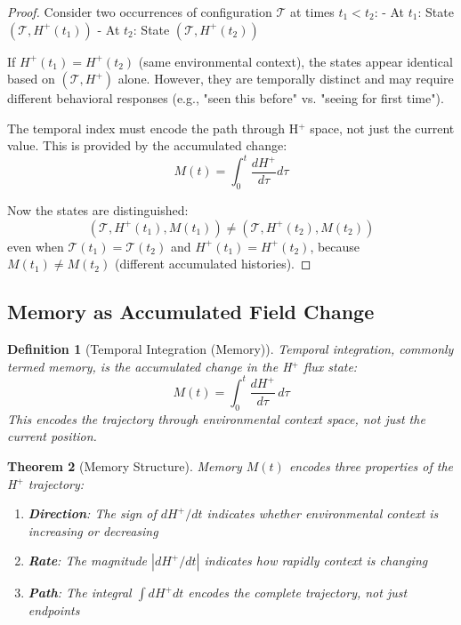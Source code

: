 \documentclass[aps,prd,twocolumn,superscriptaddress,floatfix,nofootinbib]{revtex4-2}
\newtheorem{theorem}{Theorem}[section]
\newtheorem{definition}[theorem]{Definition}
\theoremstyle{remark}
\begin{document}
\begin{proof}
Consider two occurrences of configuration $\mathcal{T}$ at times $t_1 < t_2$:
- At $t_1$: State $(\mathcal{T}, H^+(t_1))$
- At $t_2$: State $(\mathcal{T}, H^+(t_2))$

If $H^+(t_1) = H^+(t_2)$ (same environmental context), the states appear identical based on $(\mathcal{T}, H^+)$ alone. However, they are temporally distinct and may require different behavioral responses (e.g., "seen this before" vs. "seeing for first time").

The temporal index must encode the path through H$^+$ space, not just the current value. This is provided by the accumulated change:
$$
M(t) = \int_0^t \frac{dH^+}{d\tau} d\tau
$$

Now the states are distinguished:
$$
(\mathcal{T}, H^+(t_1), M(t_1)) \neq (\mathcal{T}, H^+(t_2), M(t_2))
$$
even when $\mathcal{T}(t_1) = \mathcal{T}(t_2)$ and $H^+(t_1) = H^+(t_2)$, because $M(t_1) \neq M(t_2)$ (different accumulated histories).
\end{proof}

\subsection{Memory as Accumulated Field Change}

\begin{definition}[Temporal Integration (Memory)]
\label{def:memory}
Temporal integration, commonly termed memory, is the accumulated change in the H$^+$ flux state:
\begin{equation}
\boxed{M(t) = \int_0^t \frac{dH^+}{d\tau} \, d\tau}
\end{equation}
This encodes the trajectory through environmental context space, not just the current position.
\end{definition}

\begin{theorem}[Memory Structure]
\label{thm:memory}
Memory $M(t)$ encodes three properties of the H$^+$ trajectory:
\begin{enumerate}
\item \textbf{Direction}: The sign of $dH^+/dt$ indicates whether environmental context is increasing or decreasing
\item \textbf{Rate}: The magnitude $|dH^+/dt|$ indicates how rapidly context is changing
\item \textbf{Path}: The integral $\int dH^+ dt$ encodes the complete trajectory, not just endpoints
\end{enumerate}
\end{theorem}
\end{document}
